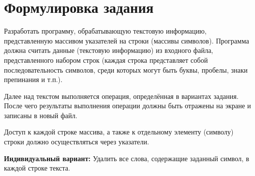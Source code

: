 \section*{Формулировка задания}

Разработать программу, обрабатывающую текстовую информацию,
представленную массивом указателей на строки (массивы символов).
Программа должна считать данные (текстовую информацию) из
входного файла, представленного набором строк (каждая строка
представляет собой последовательность символов, среди которых могут быть
буквы, пробелы, знаки препинания и т.п.). 

Далее над текстом выполняется
операция, определённая в вариантах задания. 
После чего результаты
выполнения операции должны быть отражены на экране и записаны в новый
файл.

Доступ к каждой строке массива, а также к отдельному элементу
(символу) строки должно осуществляться через указатели.

\textbf{Индивидуальный вариант:} Удалить все слова, 
содержащие заданный символ, в каждой строке текста.